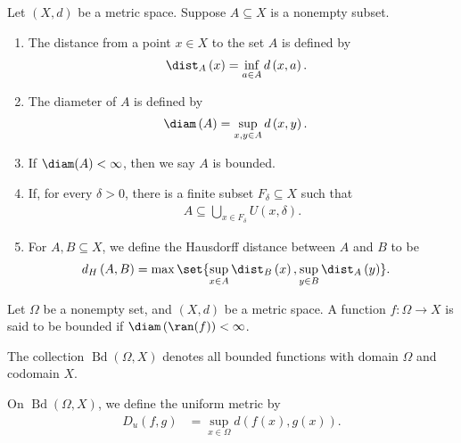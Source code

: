 \begin{definition}
  Let $\left(X,d\right)$ be a metric space. Suppose $A\subseteq X$ is a nonempty subset.
  \begin{enumerate}[(1)]
    \item The distance from a point $x\in X$ to the set $A$ is defined by
      \begin{align*}
        \dist_{A}\left(x\right) &= \inf_{a\in A}d\left(x,a\right).
      \end{align*}
    \item The diameter of $A$ is defined by
      \begin{align*}
        \diam\left(A\right) &= \sup_{x,y\in A}d\left(x,y\right).
      \end{align*}
    \item If $\diam(A) < \infty$, then we say $A$ is bounded.
    \item If, for every $\delta > 0$, there is a finite subset $F_{\delta}\subseteq X$ such that
      \begin{align*}
        A\subseteq \bigcup_{x\in F_{\delta}}U\left(x,\delta\right).
      \end{align*}
    \item For $A,B\subseteq X$, we define the Hausdorff distance between $A$ and $B$ to be
      \begin{align*}
        d_{H}\left(A,B\right) &= \max\set{\sup_{x\in A}\dist_{B}\left(x\right),\sup_{y\in B}\dist_{A}\left(y\right)}.
      \end{align*}
  \end{enumerate}
\end{definition}
\begin{example}
  Let $\Omega$ be a nonempty set, and $\left(X,d\right)$ be a metric space. A function $f\colon \Omega\rightarrow X$ is said to be bounded if $\diam\left(\ran(f)\right) < \infty$.\newline

  The collection $\operatorname{Bd}\left(\Omega,X\right)$ denotes all bounded functions with domain $\Omega$ and codomain $X$.\newline

  On $ \operatorname{Bd}\left(\Omega,X\right)$, we define the uniform metric by
  \begin{align*}
    D_{u}\left(f,g\right) &= \sup_{x\in\Omega}d\left(f(x),g(x)\right).
  \end{align*}
\end{example}
